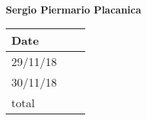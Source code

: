 \documentclass[../main.tex]{subfiles}
\begin{document}
\vspace{1cm}

\newpage

\begin{center}
	{\bf Sergio Piermario Placanica}
	\vspace{2mm}

		\begin{tabular}{p{1.3cm}|p{1.8cm}|p{6.7cm}}
			\hline
			\bf Date & \bf \makebox[1.8cm][c]{Hours} & \bf \makebox[6.7cm][c]{Description} \\
			\hline
			29/11/18 & \makebox[1.8cm][c]{2h} & \makebox[6.7cm][c]{Architechtural Design}\\
			30/11/18 & \makebox[1.8cm][c]{1h} & \makebox[6.7cm][c]{Architectural Design}\\
			
			total    & \makebox[1.8cm][c]{3h}
		\end{tabular}
	\end{center}
\end{document}

